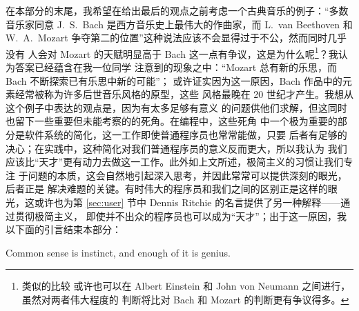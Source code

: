 在本部分的末尾，我希望在给出最后的观点之前考虑一个古典音乐的例子：“多数
音乐家同意 J.~S.\ Bach 是西方音乐史上最伟大的作曲家，而 L.\ van Beethoven
和 W.~A.\ Mozart 争夺第二的位置”这种说法应该不会显得过于不公，然而同时几乎没有
人会对 Mozart 的天赋明显高于 Bach 这一点有争议，这是为什么呢\footnote{类似的比较
或许也可以在 Albert Einstein 和 John von Neumann 之间进行，虽然对两者伟大程度的
判断将比对 Bach 和 Mozart 的判断更有争议得多。}？我认为答案已经蕴含在我一位同学
注意到的现象之中：“Mozart 总有新的乐思，而 Bach 不断探索已有乐思中新的可能”；
或许证实因为这一原因，Bach 作品中的元素经常被称为许多后世音乐风格的原型，这些
风格最晚在 20 世纪才产生。我想从这个例子中表达的观点是，因为有太多足够有意义
的问题供他们求解，但这同时也留下一些重要但未能考察的的死角。在编程中，这些死角
中一个极为重要的部分是软件系统的简化，这一工作即使普通程序员也常常能做，只要
后者有足够的决心；在实践中，这种简化对我们普通程序员的意义反而更大，所以我认为
我们应该比“天才”更有动力去做这一工作。此外如上文所述，极简主义的习惯让我们专注
于问题的本质，这会自然地引起深入思考，并因此常常可以提供深刻的眼光，后者正是
解决难题的关键。有时伟大的程序员和我们之间的区别正是这样的眼光，这或许也为第
\ref{sec:user} 节中 Dennis Ritchie 的名言提供了另一种解释——通过贯彻极简主义，
即使并不出众的程序员也可以成为“天才”；出于这一原因，我以下面的引言结束本部分：
\begin{quoting}
	Common sense is instinct, and enough of it is genius.
\end{quoting}

